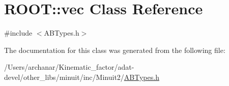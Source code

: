 \hypertarget{classROOT_1_1Minuit2_1_1vec}{}\section{R\+O\+OT\+:\+:vec Class Reference}
\label{classROOT_1_1Minuit2_1_1vec}


{\ttfamily \#include $<$A\+B\+Types.\+h$>$}



The documentation for this class was generated from the following file\+:\begin{DoxyCompactItemize}
\item 
/\+Users/archanar/\+Kinematic\+\_\+factor/adat-\/devel/other\+\_\+libs/minuit/inc/\+Minuit2/\mbox{\hyperlink{adat-devel_2other__libs_2minuit_2inc_2Minuit2_2ABTypes_8h}{A\+B\+Types.\+h}}\end{DoxyCompactItemize}
